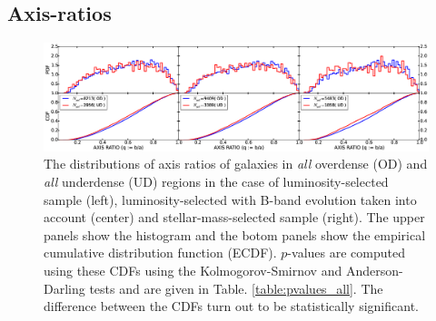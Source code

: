 \documentclass[twocolumn,useAMS,usenatbib]{mn2e}
\newcommand{\rachel}[1]{}
\begin{document}
\rachel{I also recommend splitting this section up into subsections so
  it's not just one big block.  For example, the first can be about
  axis ratios (with a subsubsection about how the results depend on
  the way the volume limiting was carried out), the second can be
  about morphology from Sersic index and bulge-to-total ratios.}

\subsection{Axis-ratios} 
\begin{figure}
 \centering
 \includegraphics[width=2.3\columnwidth]{axis_ratio_all}
 \caption{The distributions of axis ratios of galaxies in \emph{all} overdense (OD) and \emph{all} underdense (UD) regions in the case of luminosity-selected sample (left), luminosity-selected with B-band evolution taken into account (center) and stellar-mass-selected sample (right). The upper panels show the histogram
 and the botom panels show the empirical cumulative distribution function (ECDF). $p$-values are computed using these CDFs using the Kolmogorov-Smirnov and Anderson-Darling tests and are given in Table. \ref{table:pvalues_all}. The difference between the CDFs turn out to be statistically significant.}
 \label{fig:axisratio_all}
\end{figure}
\end{document}
